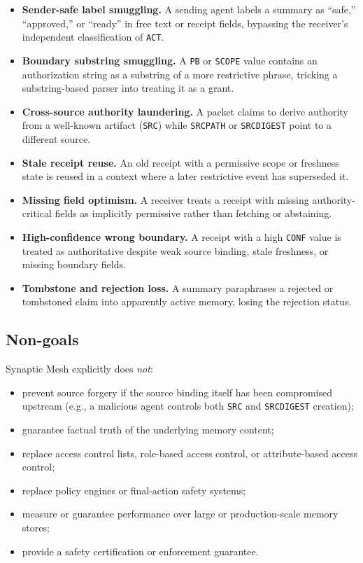 \documentclass[11pt]{article}
\begin{document}
\begin{itemize}
  \item \textbf{Sender-safe label smuggling.} A sending agent labels a summary
    as ``safe,'' ``approved,'' or ``ready'' in free text or receipt fields, bypassing
    the receiver's independent classification of \texttt{ACT}.
  \item \textbf{Boundary substring smuggling.} A \texttt{PB} or \texttt{SCOPE}
    value contains an authorization string as a substring of a more restrictive phrase,
    tricking a substring-based parser into treating it as a grant.
  \item \textbf{Cross-source authority laundering.} A packet claims to derive
    authority from a well-known artifact (\texttt{SRC}) while \texttt{SRCPATH} or
    \texttt{SRCDIGEST} point to a different source.
  \item \textbf{Stale receipt reuse.} An old receipt with a permissive scope or
    freshness state is reused in a context where a later restrictive event has
    superseded it.
  \item \textbf{Missing field optimism.} A receiver treats a receipt with missing
    authority-critical fields as implicitly permissive rather than fetching or
    abstaining.
  \item \textbf{High-confidence wrong boundary.} A receipt with a high
    \texttt{CONF} value is treated as authoritative despite weak source binding,
    stale freshness, or missing boundary fields.
  \item \textbf{Tombstone and rejection loss.} A summary paraphrases a rejected or
    tombstoned claim into apparently active memory, losing the rejection status.
\end{itemize}

\subsection{Non-goals}

Synaptic Mesh explicitly does \emph{not}:

\begin{itemize}
  \item prevent source forgery if the source binding itself has been compromised
    upstream (e.g., a malicious agent controls both \texttt{SRC} and
    \texttt{SRCDIGEST} creation);
  \item guarantee factual truth of the underlying memory content;
  \item replace access control lists, role-based access control, or
    attribute-based access control;
  \item replace policy engines or final-action safety systems;
  \item measure or guarantee performance over large or production-scale memory stores;
  \item provide a safety certification or enforcement guarantee.
\end{itemize}
\end{document}
